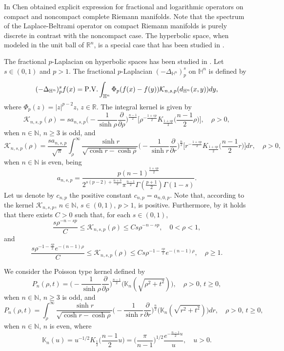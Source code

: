 \documentclass[a4paper,10pt, reqno]{amsart}
\theoremstyle{definition}
\theoremstyle{remark}
\numberwithin{equation}{section}
\begin{document}
In \cite{Ch} Chen obtained explicit expression for fractional and logarithmic operators on compact and noncompact complete Riemann manifolds. Note that the spectrum of the Laplace-Beltrami operator on compact Riemann manifolds is purely discrete in contrast with the noncompact case. The hyperbolic space, when modeled in the unit ball of $\mathbb R^n$, is a special case that has been studied in \cite[\S 4]{Ch}.

The fractional $p$-Laplacian on hyperbolic spaces has been studied in \cite{KKL}. Let $s\in (0,1)$ and $p>1$. The fractional $p$-Laplacian $(-\Delta_{\mathbb H^n})_p^s$ on $\mathbb H^n$ is defined by
$$
(-\Delta_{\mathbb H^n})_p^sf(x)={\rm P.V.} \int_{\mathbb H^n}\Phi _p(f(x)-f(y))\mathcal K_{n,s,p}(d_{\mathbb H^n}(x,y))dy,
$$
where $\Phi_p(z)=|z|^{p-2}z$, $z\in \mathbb R$. The integral kernel is given by
$$
\mathcal K_{n,s,p}(\rho )=sa_{n,s,p}\Big(-\frac{1}{\sinh \rho }\frac{\partial }{\partial \rho}\Big)^{\frac{n-1}{2}}\Big[\rho ^{-\frac{1+sp}{2}}K_{\frac{1+sp}{2}}\Big(\frac{n-1}{2}\rho \Big)\Big], \quad \rho >0,
$$
when $n\in \mathbb N$, $n\geq 3$ is odd, and
$$
\mathcal K_{n,s,p}(\rho )=\frac{sa_{n,s,p}}{\sqrt{\pi}}\int_\rho ^\infty \frac{\sinh r}{\sqrt{\cosh r-\cosh \rho }}\Big(-\frac{1}{\sinh r}\frac{\partial }{\partial r}\Big)^{\frac{n}{2}}\Big[r^{-\frac{1+sp}{2}}K_{\frac{1+sp}{2}}\Big(\frac{n-1}{2}r\Big)\Big]dr, \quad \rho >0,
$$
when $n\in \mathbb N$ is even, being
$$
a_{n,s,p}= \frac{p(n-1)^{\frac{1+sp}{2}}}{2^{s(p-2)+\frac{n+3}{2}}\pi ^{\frac{n-1}{2}}\Gamma (\frac{p+1}{2})\Gamma (1-s)}.
$$
Let us denote by $c_{n,p}$ the positive constant $c_{n,p}=a_{n,0,p}$. Note that, according to \cite[Corollary 3.3]{KKL} the kernel $\mathcal K_{n,s,p}$, $n\in \mathbb N$, $s\in (0,1)$, $p>1$,  is positive. Furthermore, by \cite[Proposition 1.2]{KKL} it holds that there exists $C>0$ such that, for each $s\in (0,1)$,
\begin{equation}\label{K0}
\frac{s\rho ^{-n-sp}}{C}\leq \mathcal K_{n,s,p}(\rho )\leq Cs\rho ^{-n-sp},\quad 0<\rho <1,
\end{equation}
and 
\begin{equation}\label{Kinfty}
\frac{s\rho ^{-1-\frac{sp}{2}}e^{-(n-1)\rho }}{C}\leq \mathcal K_{n,s,p}(\rho )\leq Cs\rho ^{-1-\frac{sp}{2}}e^{-(n-1)\rho },\quad\rho \geq 1.
\end{equation}


We consider the Poisson type kernel defined by
$$
P_n(\rho ,t)=\Big(-\frac{1}{\sinh \rho }\frac{\partial }{\partial \rho}\Big)^{\frac{n-1}{2}}\Big(\mathbb K_n(\sqrt{\rho ^2+t^2})\Big),\quad \rho >0,\,t\geq 0,
$$
when $n\in \mathbb N$, $n\geq 3$ is odd, and
$$
P_n(\rho ,t)=\int_\rho ^\infty \frac{\sinh r}{\sqrt{\cosh r-\cosh\rho }}\Big(-\frac{1}{\sinh r}\frac{\partial }{\partial r}\Big)^{\frac{n}{2}}\Big(\mathbb K_n(\sqrt{r^2+t^2})\Big)dr,\quad \rho >0,\,t\geq 0,
$$
when $n\in \mathbb N$, $n$ is even, where
$$
\mathbb K_n(u)=u^{-1/2}K_{\frac{1}{2}}\big(\frac{n-1}{2}u\big)=\Big(\frac{\pi}{n-1}\Big)^{1/2}\frac{e^{-\frac{n-1}{2}u}}{u},\quad u>0.
$$
\end{document}
